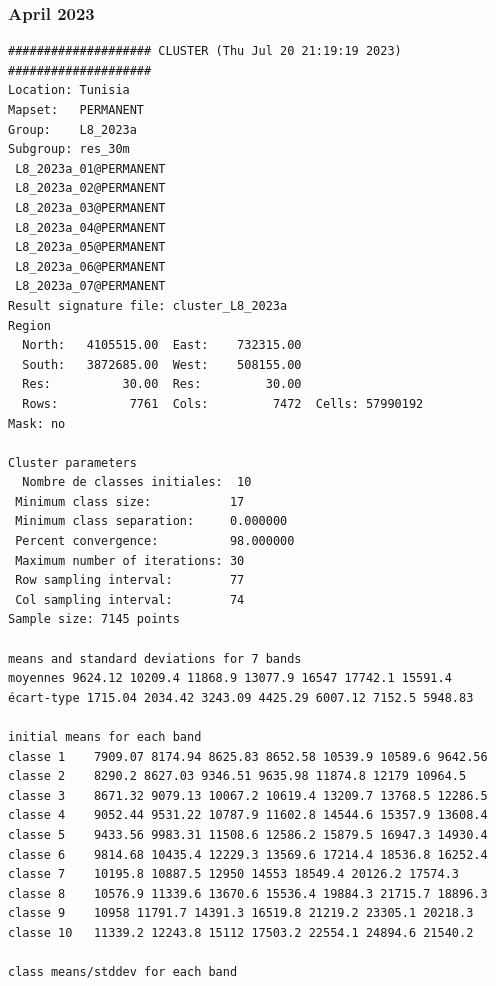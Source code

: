 \documentclass[land,article,submit,pdftex,moreauthors]{Definitions/mdpi}
\begin{document}
\subsubsection[\appendixname~\thesubsubsection]{April 2023}
\begin{scriptsize}
\begin{verbatim}
#################### CLUSTER (Thu Jul 20 21:19:19 2023) ####################
Location: Tunisia
Mapset:   PERMANENT
Group:    L8_2023a
Subgroup: res_30m
 L8_2023a_01@PERMANENT
 L8_2023a_02@PERMANENT
 L8_2023a_03@PERMANENT
 L8_2023a_04@PERMANENT
 L8_2023a_05@PERMANENT
 L8_2023a_06@PERMANENT
 L8_2023a_07@PERMANENT
Result signature file: cluster_L8_2023a
Region
  North:   4105515.00  East:    732315.00
  South:   3872685.00  West:    508155.00
  Res:          30.00  Res:         30.00
  Rows:          7761  Cols:         7472  Cells: 57990192
Mask: no

Cluster parameters
  Nombre de classes initiales: 	10
 Minimum class size:           17
 Minimum class separation:     0.000000
 Percent convergence:          98.000000
 Maximum number of iterations: 30
 Row sampling interval:        77
 Col sampling interval:        74
Sample size: 7145 points

means and standard deviations for 7 bands
moyennes 9624.12 10209.4 11868.9 13077.9 16547 17742.1 15591.4
écart-type 1715.04 2034.42 3243.09 4425.29 6007.12 7152.5 5948.83

initial means for each band
classe 1    7909.07 8174.94 8625.83 8652.58 10539.9 10589.6 9642.56
classe 2    8290.2 8627.03 9346.51 9635.98 11874.8 12179 10964.5
classe 3    8671.32 9079.13 10067.2 10619.4 13209.7 13768.5 12286.5
classe 4    9052.44 9531.22 10787.9 11602.8 14544.6 15357.9 13608.4
classe 5    9433.56 9983.31 11508.6 12586.2 15879.5 16947.3 14930.4
classe 6    9814.68 10435.4 12229.3 13569.6 17214.4 18536.8 16252.4
classe 7    10195.8 10887.5 12950 14553 18549.4 20126.2 17574.3
classe 8    10576.9 11339.6 13670.6 15536.4 19884.3 21715.7 18896.3
classe 9    10958 11791.7 14391.3 16519.8 21219.2 23305.1 20218.3
classe 10   11339.2 12243.8 15112 17503.2 22554.1 24894.6 21540.2

class means/stddev for each band


\end{verbatim}
\end{scriptsize}
\end{document}
